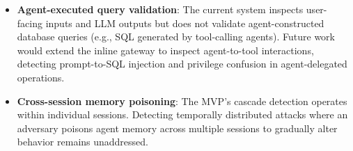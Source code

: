 \documentclass[12pt,a4paper]{article}
\begin{document}
\begin{itemize}[leftmargin=*]
    \item \textbf{Agent-executed query validation}: The current system inspects user-facing inputs and LLM outputs but does not validate agent-constructed database queries (e.g., SQL generated by tool-calling agents). Future work would extend the inline gateway to inspect agent-to-tool interactions, detecting prompt-to-SQL injection and privilege confusion in agent-delegated operations.
    \item \textbf{Cross-session memory poisoning}: The MVP's cascade detection operates within individual sessions. Detecting temporally distributed attacks where an adversary poisons agent memory across multiple sessions to gradually alter behavior remains unaddressed.
\end{itemize}



\end{document}
